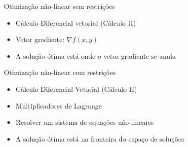 \documentclass{beamer}
\begin{document}
\begin{frame}{Otimização não-linear sem restrições}
  \begin{itemize}
  \item Cálculo Diferencial vetorial (Cálculo II)
  \item Vetor gradiente: $\nabla f(x,y)$
  \item A solução ótima está onde o vetor gradiente se anula
  \end{itemize}
\end{frame}

\begin{frame}{Otimização não-linear com restrições}
  \begin{itemize}
  \item Cálculo Diferencial Vetorial (Cálculo II)
  \item Multiplicadores de Lagrange
  \item Resolver um sistema de equações não-lineares
  \item A solução ótima está na fronteira do espaço de soluções
  \end{itemize}
\end{frame}
\end{document}

